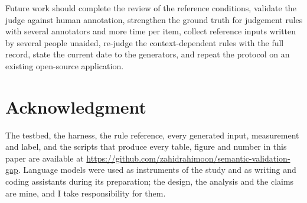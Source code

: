 \documentclass[conference]{IEEEtran}
\begin{document}
Future work should \ifreviewed\else complete the review of the reference conditions, \fi
\ifhumanlabels\else validate the judge against human annotation, \fi strengthen the ground truth for
judgement rules with several annotators and more time per item, collect reference inputs written by
several people unaided, re-judge the context-dependent rules with the full record, state the current
date to the generators, and repeat the protocol on an existing open-source application.

\section*{Acknowledgment}

The testbed, the harness, the rule reference, every generated input, measurement and label, and the
scripts that produce every table, figure and number in this paper are available at
\url{https://github.com/zahidrahimoon/semantic-validation-gap}. Language models were used as
instruments of the study and as writing and coding assistants during its preparation; the design, the
analysis and the claims are mine, and I take responsibility for them.



\end{document}
